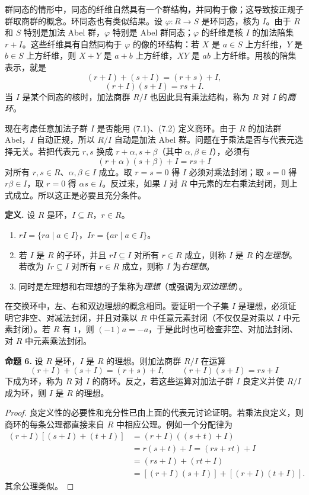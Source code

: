 群同态的情形中，同态的纤维自然具有一个群结构，并同构于像；这导致按正规子群取商群的概念。环同态也有类似结果。设 $\varphi:R\to S$ 是环同态，核为 $I$。由于 $R$ 和 $S$ 特别是加法 Abel 群，$\varphi$ 特别是 Abel 群同态；$\varphi$ 的纤维是核 $I$ 的加法陪集 $r+I$。这些纤维具有自然同构于 $\varphi$ 的像的环结构：若 $X$ 是 $a\in S$ 上方纤维，$Y$ 是 $b\in S$ 上方纤维，则 $X+Y$ 是 $a+b$ 上方纤维，$XY$ 是 $ab$ 上方纤维。用核的陪集表示，就是
\[
  (r+I)+(s+I)=(r+s)+I,
  \tag{7.1}
\]
\[
  (r+I)(s+I)=rs+I.
  \tag{7.2}
\]
当 $I$ 是某个同态的核时，加法商群 $R/I$ 也因此具有乘法结构，称为 $R$ 对 $I$ 的\emph{商环}。

现在考虑任意加法子群 $I$ 是否能用 (7.1)、(7.2) 定义商环。由于 $R$ 的加法群 Abel，$I$ 自动正规，所以 $R/I$ 自动是加法 Abel 群。问题在于乘法是否与代表元选择无关。若把代表元 $r,s$ 换成 $r+\alpha,s+\beta$（其中 $\alpha,\beta\in I$），必须有
\[
  (r+\alpha)(s+\beta)+I=rs+I
\]
对所有 $r,s\in R$、$\alpha,\beta\in I$ 成立。取 $r=s=0$ 得 $I$ 必须对乘法封闭；取 $s=0$ 得 $r\beta\in I$，取 $r=0$ 得 $\alpha s\in I$。反过来，如果 $I$ 对 $R$ 中元素的左右乘法封闭，则上式成立。所以这正是必要且充分条件。

\medskip
\noindent\textbf{定义.} 设 $R$ 是环，$I\subseteq R$，$r\in R$。
\begin{enumerate}[label=(\arabic*)]
  \item $rI=\{ra\mid a\in I\}$，$Ir=\{ar\mid a\in I\}$。
  \item 若 $I$ 是 $R$ 的子环，并且 $rI\subseteq I$ 对所有 $r\in R$ 成立，则称 $I$ 是 $R$ 的\emph{左理想}。若改为 $Ir\subseteq I$ 对所有 $r\in R$ 成立，则称 $I$ 为\emph{右理想}。
  \item 同时是左理想和右理想的子集称为\emph{理想}（或强调为\emph{双边理想}）。
\end{enumerate}

在交换环中，左、右和双边理想的概念相同。要证明一个子集 $I$ 是理想，必须证明它非空、对减法封闭，并且对乘以 $R$ 中任意元素封闭（不仅仅是对乘以 $I$ 中元素封闭）。若 $R$ 有 $1$，则 $(-1)a=-a$，于是此时也可检查非空、对加法封闭、对 $R$ 中元素乘法封闭。

\medskip
\noindent\textbf{命题 6.} 设 $R$ 是环，$I$ 是 $R$ 的理想。则加法商群 $R/I$ 在运算
\[
  (r+I)+(s+I)=(r+s)+I,
  \qquad
  (r+I)(s+I)=rs+I
\]
下成为环，称为 $R$ 对 $I$ 的商环。反之，若这些运算对加法子群 $I$ 良定义并使 $R/I$ 成为环，则 $I$ 是 $R$ 的理想。

\begin{proof}
良定义性的必要性和充分性已由上面的代表元讨论证明。若乘法良定义，则商环的每条公理都直接来自 $R$ 中相应公理。例如一个分配律为
\[
\begin{aligned}
 (r+I)[(s+I)+(t+I)]&=(r+I)((s+t)+I)\\
 &=r(s+t)+I=(rs+rt)+I\\
 &=(rs+I)+(rt+I)\\
 &=[(r+I)(s+I)]+[(r+I)(t+I)].
\end{aligned}
\]
其余公理类似。
\end{proof}

